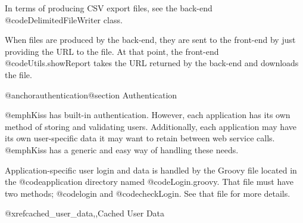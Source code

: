 In terms of producing CSV export files, see the back-end
@code{DelimitedFileWriter} class.

When files are produced by the back-end, they are sent to the
front-end by just providing the URL to the file.  At that point, the
front-end @code{Utils.showReport} takes the URL returned by the back-end
and downloads the file.

@anchor{authentication}@section Authentication

@emph{Kiss} has built-in authentication.  However, each application has its
own method of storing and validating users.  Additionally, each application
may have its own user-specific data it may want to retain between web service
calls. @emph{Kiss} has a generic and easy way of handling these needs.

Application-specific user login and data is handled by the Groovy file
located in the @code{application} directory named @code{Login.groovy}.
That file must have two methods; @code{login} and @code{checkLogin}.  
See that file for more details.

@xref{cached_user_data,,Cached User Data}
